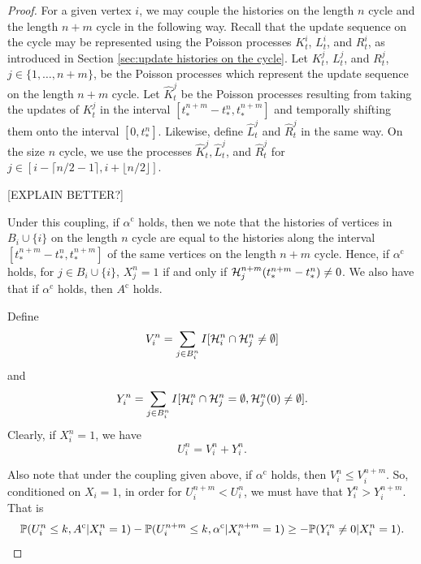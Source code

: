 \begin{proof}
		For a given vertex $i$, we may couple the histories on the length $n$ cycle and the length $n+m$ cycle in the following way. Recall that the update sequence on the cycle may be represented using the Poisson processes $K_t^i$, $L_t^i$, and $R_t^i$, as introduced in Section \ref{sec:update histories on the cycle}. Let $K_t^j$, $L_t^j$, and $R_t^j$, $j \in \{1,\dots, n+m\}$, be the Poisson processes which represent the update sequence on the length $n+m$ cycle. Let $\hat{K}_t^j$ be the Poisson processes resulting from taking the updates of $K_t^j$ in the interval $[t_*^{n+m} - t_*^n, t_*^{n+m}]$ and temporally shifting them onto the interval $[0, t_*^n]$. Likewise, define $\hat{L}_t^j$ and $\hat{R}_t^j$ in the same way. On the size $n$ cycle, we use the processes $\hat{K}_t^j, \hat{L}_t^j$, and $\hat{R}_t^j$ for $j \in [i- \lceil n/2 - 1 \rceil, i + \lfloor n/2\rfloor]$. 

		[EXPLAIN BETTER?]

		Under this coupling, if $\alpha^\mathrm{c}$ holds, then we note that the histories of vertices in $B_i \cup \{i\}$ on the length $n$ cycle are equal to the histories along the interval $[t_*^{n+m} - t_*^n, t_*^{n+m}]$ of the same vertices on the length $n+m$ cycle. Hence, if $\alpha^\mathrm{c}$ holds, for $j \in B_i \cup \{i\}$, $X_j^n = 1$ if and only if $\mathcal{H}_j^{n+m}(t_*^{n+m} - t_*^n) \neq 0$. We also have that if $\alpha^\mathrm{c}$ holds, then $A^\mathrm{c}$ holds. 

		Define 
		\begin{equation}
			V_i^n = \sum_{j \in B_i^n} I[\mathcal{H}_i^n \cap \mathcal{H}_j^n \neq \emptyset]
		\end{equation}
		and
		\begin{equation}
			Y_i^n = \sum_{j \in B_i^n} I[\mathcal{H}_i^n \cap \mathcal{H}_j^n = \emptyset, \mathcal{H}_j^n(0) \neq \emptyset].
		\end{equation}
		Clearly, if $X_i^n = 1$, we have
		\begin{equation}
			U_i^n = V_i^n + Y_i^n.
		\end{equation}

		Also note that under the coupling given above, if $\alpha^\mathrm{c}$ holds, then $V_i^n \leq V_i^{n+m}$. So, conditioned on $X_i = 1$, in order for $U_i^{n+m} < U_i^n$, we must have that $Y_i^n > Y_i^{n+m}$. That is
		\begin{equation}
			\mathbb{P}(U_i^n \leq k, A^\mathrm{c} | X_i^n = 1) - \mathbb{P}(U_i^{n+m} \leq k, \alpha^\mathrm{c} | X_i^{n+m} = 1) \geq -\mathbb{P}(Y_i^n \neq 0 | X_i^n = 1).
		\end{equation}


\end{proof}

